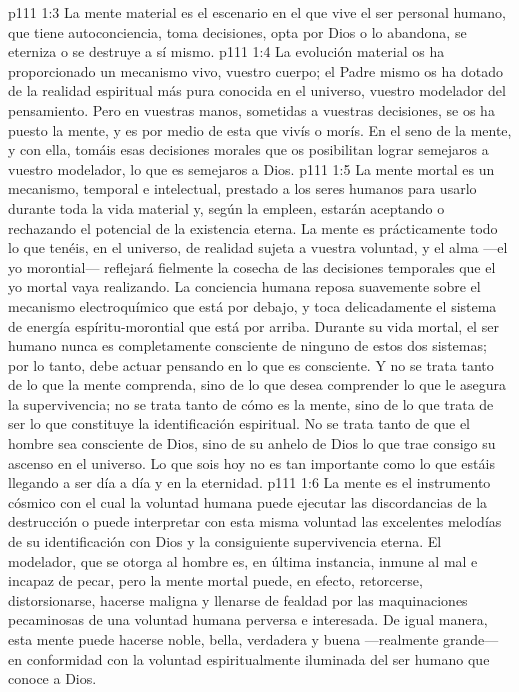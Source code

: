 \vs p111 1:3 \pc La mente material es el escenario en el que vive el ser personal humano, que tiene autoconciencia, toma decisiones, opta por Dios o lo abandona, se eterniza o se destruye a sí mismo.
\vs p111 1:4 \pc La evolución material os ha proporcionado un mecanismo vivo, vuestro cuerpo; el Padre mismo os ha dotado de la realidad espiritual más pura conocida en el universo, vuestro modelador del pensamiento. Pero en vuestras manos, sometidas a vuestras decisiones, se os ha puesto la mente, y es por medio de esta que vivís o morís. En el seno de la mente, y con ella, tomáis esas decisiones morales que os posibilitan lograr semejaros a vuestro modelador, lo que es semejaros a Dios.
\vs p111 1:5 La mente mortal es un mecanismo, temporal e intelectual, prestado a los seres humanos para usarlo durante toda la vida material y, según la empleen, estarán aceptando o rechazando el potencial de la existencia eterna. La mente es prácticamente todo lo que tenéis, en el universo, de realidad sujeta a vuestra voluntad, y el alma ---el yo morontial--- reflejará fielmente la cosecha de las decisiones temporales que el yo mortal vaya realizando. La conciencia humana reposa suavemente sobre el mecanismo electroquímico que está por debajo, y toca delicadamente el sistema de energía espíritu\hyp{}morontial que está por arriba. Durante su vida mortal, el ser humano nunca es completamente consciente de ninguno de estos dos sistemas; por lo tanto, debe actuar pensando en lo que es consciente. Y no se trata tanto de lo que la mente comprenda, sino de lo que desea comprender lo que le asegura la supervivencia; no se trata tanto de cómo es la mente, sino de lo que trata de ser lo que constituye la identificación espiritual. No se trata tanto de que el hombre sea consciente de Dios, sino de su anhelo de Dios lo que trae consigo su ascenso en el universo. Lo que sois hoy no es tan importante como lo que estáis llegando a ser día a día y en la eternidad.
\vs p111 1:6 La mente es el instrumento cósmico con el cual la voluntad humana puede ejecutar las discordancias de la destrucción o puede interpretar con esta misma voluntad las excelentes melodías de su identificación con Dios y la consiguiente supervivencia eterna. El modelador, que se otorga al hombre es, en última instancia, inmune al mal e incapaz de pecar, pero la mente mortal puede, en efecto, retorcerse, distorsionarse, hacerse maligna y llenarse de fealdad por las maquinaciones pecaminosas de una voluntad humana perversa e interesada. De igual manera, esta mente puede hacerse noble, bella, verdadera y buena ---realmente grande--- en conformidad con la voluntad espiritualmente iluminada del ser humano que conoce a Dios.
